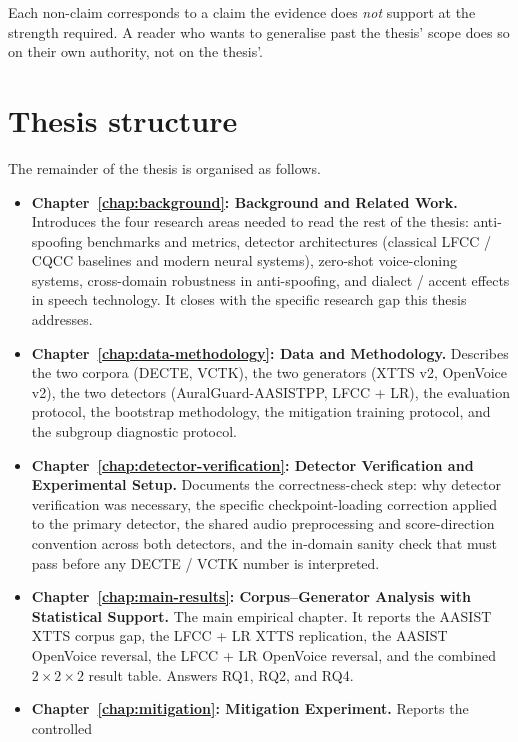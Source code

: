 Each non-claim corresponds to a claim the evidence does \emph{not}
support at the strength required. A reader who wants to generalise
past the thesis' scope does so on their own authority, not on the
thesis'.


\section{Thesis structure}
\label{sec:introduction-structure}

The remainder of the thesis is organised as follows.

\begin{itemize}
    \item \textbf{Chapter~\ref{chap:background}: Background and Related Work.} Introduces the
        four research areas needed to read the rest of the thesis:
        anti-spoofing benchmarks and metrics, detector architectures
        (classical LFCC / CQCC baselines and modern neural systems),
        zero-shot voice-cloning systems, cross-domain robustness in
        anti-spoofing, and dialect / accent effects in speech
        technology. It closes with the specific research gap this
        thesis addresses.
    \item \textbf{Chapter~\ref{chap:data-methodology}: Data and Methodology.} Describes the two
        corpora (DECTE, VCTK), the two generators (XTTS v2, OpenVoice
        v2), the two detectors (AuralGuard-AASISTPP, LFCC + LR), the
        evaluation protocol, the bootstrap methodology, the mitigation
        training protocol, and the subgroup diagnostic protocol.
    \item \textbf{Chapter~\ref{chap:detector-verification}: Detector Verification and Experimental Setup.}
        Documents the correctness-check step: why detector verification
        was necessary, the specific checkpoint-loading correction
        applied to the primary detector, the shared audio preprocessing
        and score-direction convention across both detectors, and the
        in-domain sanity check that must pass before any DECTE / VCTK
        number is interpreted.
    \item \textbf{Chapter~\ref{chap:main-results}: Corpus--Generator Analysis with Statistical
        Support.} The main empirical chapter. It reports the AASIST
        XTTS corpus gap, the LFCC + LR XTTS replication, the AASIST
        OpenVoice reversal, the LFCC + LR OpenVoice reversal, and the
        combined $2 \times 2 \times 2$ result table. Answers RQ1, RQ2,
        and RQ4.
    \item \textbf{Chapter~\ref{chap:mitigation}: Mitigation Experiment.} Reports the controlled

\end{itemize}
